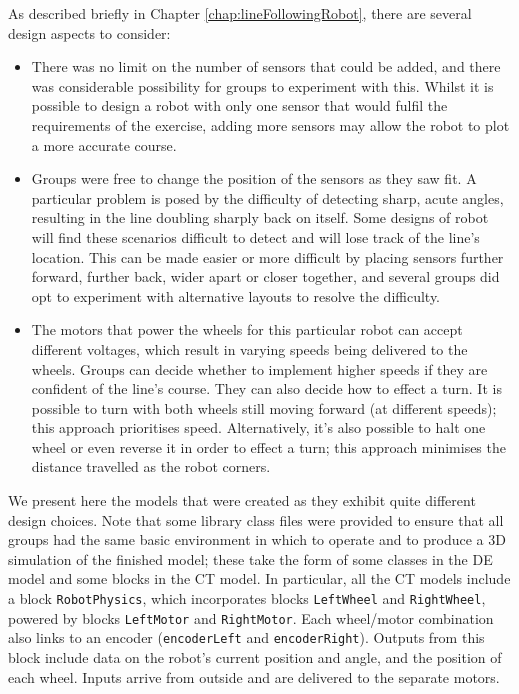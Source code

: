 As described briefly in Chapter \ref{chap:lineFollowingRobot}, there
are several design aspects to consider:
\begin{itemize}
\item There was no limit on the number of sensors that could be added,
  and there was considerable possibility for groups to experiment with
  this.  Whilst it is possible to design a robot with only one sensor
  that would fulfil the requirements of the exercise, adding more
  sensors may allow the robot to plot a more accurate course.
\item Groups were free to change the position of the sensors as they
  saw fit.  A particular problem is posed by the difficulty of
  detecting sharp, acute angles, resulting in the line doubling
  sharply back on itself.  Some designs of robot will find these
  scenarios difficult to detect and will lose track of the line's
  location.  This can be made easier or more difficult by placing
  sensors further forward, further back, wider apart or closer
  together, and several groups did opt to experiment with alternative
  layouts to resolve the difficulty.
\item The motors that power the wheels for this particular robot can
  accept different voltages, which result in varying speeds being
  delivered to the wheels.  Groups can decide whether to implement
  higher speeds if they are confident of the line's course.  They can
  also decide how to effect a turn.  It is possible to turn with both
  wheels still moving forward (at different speeds); this approach
  prioritises speed.  Alternatively, it's also possible to halt one
  wheel or even reverse it in order to effect a turn; this approach
  minimises the distance travelled as the robot corners.
\end{itemize}

We present here the models that were created as they exhibit quite
different design choices.  Note that some library class files were
provided to ensure that all groups had the same basic environment in
which to operate and to produce a 3D simulation of the finished model;
these take the form of some classes in the DE model and some blocks in
the CT model.  In particular, all the CT models include a block
\texttt{RobotPhysics}, which incorporates blocks \texttt{LeftWheel}
and \texttt{RightWheel}, powered by blocks \texttt{LeftMotor} and
\texttt{RightMotor}.  Each wheel/motor combination also links to an
encoder (\texttt{encoderLeft} and \texttt{encoderRight}).  Outputs
from this block include data on the robot's current position and
angle, and the position of each wheel.  Inputs arrive from outside and
are delivered to the separate motors.

